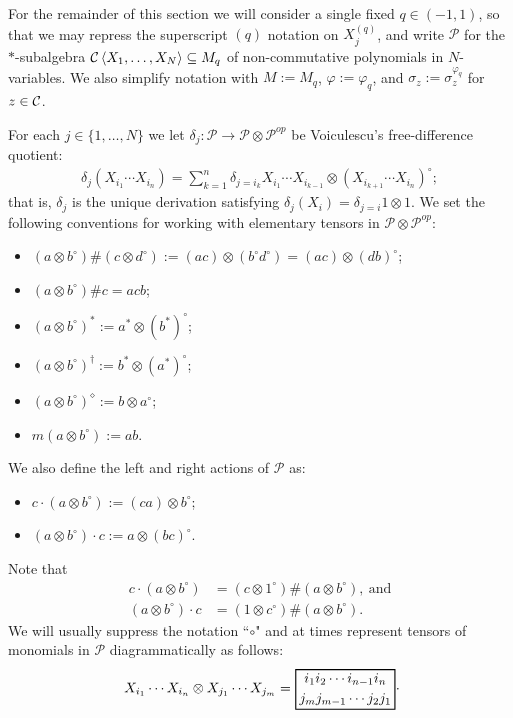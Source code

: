For the remainder of this section we will consider a single fixed $q\in (-1,1)$, so that we may repress the superscript $(q)$ notation on $X^{(q)}_j$, and write $\mathscr{P}$ for the $*$-subalgebra $\mathcal C\left\langle X_1,\ldots, X_N\right\rangle\subseteq M_q$ of non-commutative polynomials in $N$-variables. We also simplify notation with $M:=M_q$, $\varphi:=\varphi_q$, and $\sigma_z:=\sigma_z^{\varphi_q}$ for $z\in \mathcal C$.\par
For each $j\in\{1,\ldots,N\}$ we let $\delta_j\colon \mathscr{P}\rightarrow \mathscr{P}\otimes\mathscr{P}^{op}$ be Voiculescu's free-difference quotient:
	\begin{align*}
		\delta_j(X_{i_1}\cdots X_{i_n})=\sum_{k=1}^n \delta_{j=i_k} X_{i_1}\cdots X_{i_{k-1}}\otimes \left(X_{i_{k+1}}\cdots X_{i_n}\right)^\circ;
	\end{align*}
that is, $\delta_j$ is the unique derivation satisfying $\delta_j(X_i)=\delta_{j=i}1\otimes 1$. We set the following conventions for working with elementary tensors in $\mathscr{P}\otimes\mathscr{P}^{op}$:
	\begin{itemize}
		\item $(a\otimes b^\circ)\#(c\otimes d^\circ):= (ac)\otimes (b^\circ d^\circ)=(ac)\otimes (db)^\circ$;
		\item $(a\otimes b^\circ)\#c=acb$;
		\item $(a\otimes b^\circ)^*:=a^*\otimes (b^*)^\circ$;
		\item $(a\otimes b^\circ)^\dagger:= b^*\otimes (a^*)^\circ$;
		\item $(a\otimes b^\circ)^\diamond:= b\otimes a^\circ$;
		\item $m(a\otimes b^\circ):=ab$.
	\end{itemize}
We also define the left and right actions of $\mathscr{P}$ as:
	\begin{itemize}
		\item $c\cdot (a\otimes b^\circ):=(ca)\otimes b^\circ$;
		\item $(a\otimes b^\circ)\cdot c:=a\otimes (bc)^\circ$.
	\end{itemize}
Note that 
	\begin{align*}
		c\cdot (a\otimes b^\circ)&= (c\otimes 1^\circ)\# (a\otimes b^\circ),\ \text{and}\\
		(a\otimes b^\circ)\cdot c &= (1\otimes c^\circ )\# (a\otimes b^\circ).
	\end{align*}
We will usually suppress the notation ``$\circ$" and at times represent tensors  of monomials in $\mathscr{P}$ diagrammatically as follows:
	\begin{align}\label{box_notation}
	\begin{tikzpicture}[baseline]
	\draw[thick] (0,-.5) rectangle (2.5,.5);
	\node[left] at (0,0) {$X_{i_1}\cdots X_{i_n}\otimes X_{j_1}\cdots X_{j_m}=$};
	\node at (1.25,.25) {$i_1i_2\cdots i_{n-1}i_n$};
	\node at (1.25,-.25) {$j_mj_{m-1}\cdots j_2j_1$};
	\end{tikzpicture}.
	\end{align}
